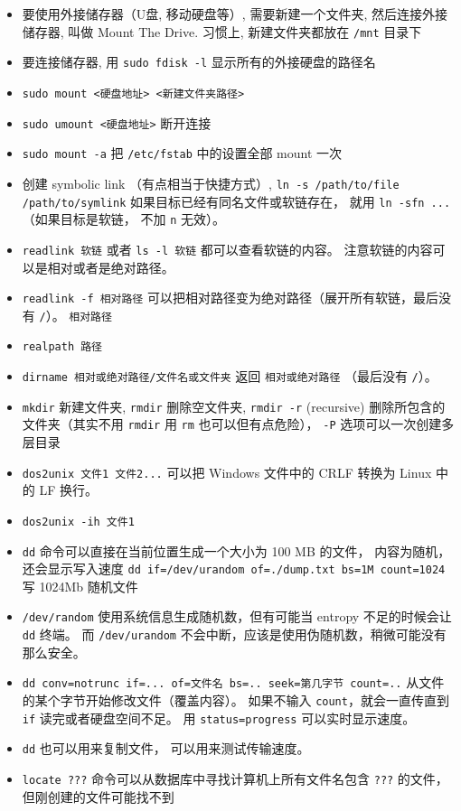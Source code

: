 \begin{itemize}
\item 要使用外接储存器（U盘, 移动硬盘等）, 需要新建一个文件夹, 然后连接外接储存器, 叫做 Mount The Drive. 习惯上, 新建文件夹都放在 \verb`/mnt` 目录下
\item 要连接储存器, 用 \verb`sudo fdisk -l` 显示所有的外接硬盘的路径名
\item \verb`sudo mount <硬盘地址> <新建文件夹路径>`
\item \verb`sudo umount <硬盘地址>` 断开连接
\item \verb`sudo mount -a` 把 \verb`/etc/fstab` 中的设置全部 mount 一次
\item 创建 symbolic link （有点相当于快捷方式）, \verb`ln -s /path/to/file /path/to/symlink` 如果目标已经有同名文件或软链存在， 就用 \verb`ln -sfn ...` （如果目标是软链， 不加 \verb`n` 无效）。
\item \verb`readlink 软链` 或者 \verb`ls -l 软链` 都可以查看软链的内容。 注意软链的内容可以是相对或者是绝对路径。
\item \verb`readlink -f 相对路径` 可以把相对路径变为绝对路径（展开所有软链，最后没有 \verb`/`）。 \verb`相对路径`
\item \verb`realpath 路径`
\item \verb`dirname 相对或绝对路径/文件名或文件夹` 返回 \verb`相对或绝对路径` （最后没有 \verb`/`）。
\item \verb`mkdir` 新建文件夹, \verb`rmdir` 删除空文件夹, \verb`rmdir -r` (recursive) 删除所包含的文件夹（其实不用 \verb`rmdir` 用 \verb`rm` 也可以但有点危险）， \verb`-P` 选项可以一次创建多层目录
\item \verb`dos2unix 文件1 文件2...` 可以把 Windows 文件中的 CRLF 转换为 Linux 中的 LF 换行。 
\item \verb`dos2unix -ih 文件1`
\item \verb`dd` 命令可以直接在当前位置生成一个大小为 100 MB 的文件， 内容为随机， 还会显示写入速度
\verb`dd if=/dev/urandom of=./dump.txt bs=1M count=1024` 写 1024Mb 随机文件
\item \verb`/dev/random` 使用系统信息生成随机数，但有可能当 entropy 不足的时候会让 \verb`dd` 终端。 而 \verb`/dev/urandom` 不会中断，应该是使用伪随机数，稍微可能没有那么安全。
\item \verb`dd conv=notrunc if=... of=文件名 bs=.. seek=第几字节 count=..`  从文件的某个字节开始修改文件（覆盖内容）。 如果不输入 \verb`count`，就会一直传直到 \verb`if` 读完或者硬盘空间不足。 用 \verb`status=progress` 可以实时显示速度。
\item \verb`dd` 也可以用来复制文件， 可以用来测试传输速度。
\item \verb`locate ???` 命令可以从数据库中寻找计算机上所有文件名包含 \verb`???` 的文件， 但刚创建的文件可能找不到

\end{itemize}

